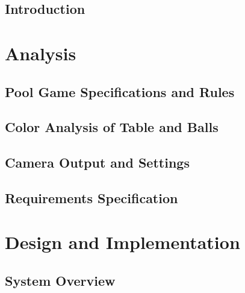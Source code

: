 
\usepackage{float}
\usepackage{graphicx}
\usepackage{listings}
\usepackage{subfig}








\tableofcontents

\chapter{Introduction}
	

\part{Analysis}
	
	\label{sec:analysis}
	
	\chapter{Pool Game Specifications and Rules}
			\label{sec:rules}
					
	
	\chapter{Color Analysis of Table and Balls}
		\label{sec:analysisballstable}
		
	
	\chapter{Camera Output and Settings}
		\label{sec:camera}
		
					
	\chapter{Requirements Specification}
		\label{sec:reqspec}
		

\part{Design and Implementation}
	\label{solution}
	
	
	\chapter{System Overview}
		\label{sec:sysdesign}
		


